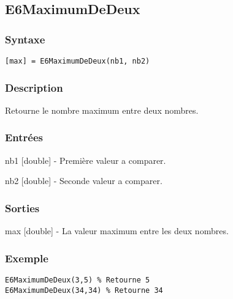 \begin{minipage}{\linewidth}
\subsection*{E6MaximumDeDeux}
\subsubsection*{Syntaxe}
\begin{lstlisting}
[max] = E6MaximumDeDeux(nb1, nb2)
\end{lstlisting}
\subsubsection*{Description}
Retourne le nombre maximum entre deux nombres.
\subsubsection*{Entrées}
\begin{description}
\item nb1 [double] - Première valeur a comparer. 
\item nb2 [double] - Seconde valeur a comparer. 
\end{description} \subsubsection*{Sorties}
\begin{description}
\item max [double] - La valeur maximum entre les deux nombres. 
\end{description} 
\subsubsection*{Exemple}
\begin{lstlisting}
E6MaximumDeDeux(3,5) % Retourne 5 
E6MaximumDeDeux(34,34) % Retourne 34
\end{lstlisting} \medskip
\end{minipage}